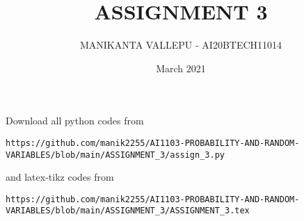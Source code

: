 \documentclass[journal,12pt,twocolumn]{IEEEtran}
\date{March 2021}
\DeclareMathOperator*{\Res}{Res}
\begin{document}
\newcommand{\BEQA}{\begin{eqnarray}}
\newcommand{\EEQA}{\end{eqnarray}}
\newcommand{\define}{\stackrel{\triangle}{=}}

\raggedbottom
\setlength{\parindent}{0pt}
\providecommand{\mbf}{\mathbf}
\providecommand{\pr}[1]{\ensuremath{\Pr\left(#1\right)}}
\providecommand{\qfunc}[1]{\ensuremath{Q\left(#1\right)}}
\providecommand{\fn}[1]{\ensuremath{f\left(#1\right)}}
\providecommand{\e}[1]{\ensuremath{E\left(#1\right)}}
\providecommand{\sbrak}[1]{\ensuremath{{}\left[#1\right]}}
\providecommand{\lsbrak}[1]{\ensuremath{{}\left[#1\right.}}
\providecommand{\rsbrak}[1]{\ensuremath{{}\left.#1\right]}}
\providecommand{\brak}[1]{\ensuremath{\left(#1\right)}}
\providecommand{\lbrak}[1]{\ensuremath{\left(#1\right.}}
\providecommand{\rbrak}[1]{\ensuremath{\left.#1\right)}}
\providecommand{\cbrak}[1]{\ensuremath{\left\{#1\right\}}}
\providecommand{\lcbrak}[1]{\ensuremath{\left\{#1\right.}}
\providecommand{\rcbrak}[1]{\ensuremath{\left.#1\right\}}}
\theoremstyle{remark}
\newtheorem{rem}{Remark}
\newcommand{\sgn}{\mathop{\mathrm{sgn}}}
\providecommand{\abs}[1]{\vert#1\vert}
\providecommand{\res}[1]{\Res\displaylimits_{#1}} 
\providecommand{\norm}[1]{\lVert#1\rVert}
\providecommand{\mtx}[1]{\mathbf{#1}}
\providecommand{\mean}[1]{E[ #1 ]}
\providecommand{\fourier}{\overset{\mathcal{F}}{ \rightleftharpoons}}
\providecommand{\system}{\overset{\mathcal{H}}{ \longleftrightarrow}}
\newcommand{\solution}{\noindent \textbf{Solution: }}
\newcommand{\cosec}{\,\text{cosec}\,}
\providecommand{\dec}[2]{\ensuremath{\overset{#1}{\underset{#2}{\gtrless}}}}
\newcommand{\myvec}[1]{\ensuremath{\begin{pmatrix}#1\end{pmatrix}}}
\newcommand{\mydet}[1]{\ensuremath{\begin{vmatrix}#1\end{vmatrix}}}
\makeatletter
\vspace{3cm}
\title{ASSIGNMENT 3}
\author{MANIKANTA VALLEPU - AI20BTECH11014}
\maketitle
\newpage
\bigskip
\renewcommand{\thetable}{\theenumi}
Download all python codes from 
\begin{lstlisting}
https://github.com/manik2255/AI1103-PROBABILITY-AND-RANDOM-VARIABLES/blob/main/ASSIGNMENT_3/assign_3.py
\end{lstlisting}
%
and latex-tikz codes from 
%
\begin{lstlisting}
https://github.com/manik2255/AI1103-PROBABILITY-AND-RANDOM-VARIABLES/blob/main/ASSIGNMENT_3/ASSIGNMENT_3.tex
\end{lstlisting}
\end{document}
